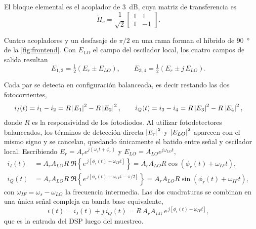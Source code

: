 El bloque elemental es el acoplador de \SI{3}{\dB}, cuya matriz de
transferencia es
\begin{equation}
  \tilde{H}_c = \frac{1}{\sqrt{2}}
  \begin{bmatrix} 1 & 1 \\ 1 & -1 \end{bmatrix}.
  \label{eq:acoplador}
\end{equation}

Cuatro acopladores y un desfasaje de $\pi/2$ en una rama forman el h\'ibrido de
\SI{90}{\degree} de la \cref{fig:frontend}. Con $E_{LO}$ el campo del
oscilador local, los cuatro campos de salida resultan
\begin{equation}
  E_{1,2} = \tfrac{1}{2}\left(E_r \pm E_{LO}\right),
  \qquad
  E_{3,4} = \tfrac{1}{2}\left(E_r \pm j\,E_{LO}\right).
  \label{eq:hibrido}
\end{equation}

Cada par se detecta en configuraci\'on balanceada, es decir restando las dos
fotocorrientes,
\begin{equation}
  i_I(t) = i_1 - i_2 = R\left\lvert E_1 \right\rvert^2 - R\left\lvert E_2 \right\rvert^2,
  \qquad
  i_Q(t) = i_3 - i_4 = R\left\lvert E_3 \right\rvert^2 - R\left\lvert E_4 \right\rvert^2,
  \label{eq:balanceado}
\end{equation}
donde $R$ es la responsividad de los fotodiodos. Al utilizar fotodetectores
balanceados, los t\'erminos de detecci\'on directa $\left\lvert E_r \right\rvert^2$ y
$\left\lvert E_{LO} \right\rvert^2$ aparecen con el mismo signo y se cancelan, quedando
\'unicamente el batido entre se\~nal y oscilador local. Escribiendo
$E_r = A_r e^{j(\omega_s t + \phi_r)}$ y $E_{LO} = A_{LO} e^{j\omega_{LO} t}$,
\begin{align}
  i_I(t) &= A_r A_{LO} R\;\Re\!\left\{e^{\,j[\phi_r(t)+\omega_{IF}t]}\right\}
          = A_r A_{LO} R\cos\!\left(\phi_r(t)+\omega_{IF}t\right),
          \label{eq:iI}\\[2pt]
  i_Q(t) &= A_r A_{LO} R\;\Re\!\left\{e^{\,j[\phi_r(t)+\omega_{IF}t-\pi/2]}\right\}
          = A_r A_{LO} R\sin\!\left(\phi_r(t)+\omega_{IF}t\right),
          \label{eq:iQ}
\end{align}
con $\omega_{IF} = \omega_s - \omega_{LO}$ la frecuencia intermedia. Las dos
cuadraturas se combinan en una \'unica se\~nal compleja en banda base
equivalente,
\begin{equation}
  i(t) = i_I(t) + j\,i_Q(t) = R\,A_r A_{LO}\, e^{\,j[\phi_r(t)+\omega_{IF}t]},
  \label{eq:banda-base}
\end{equation}
que es la entrada del DSP luego del muestreo.

